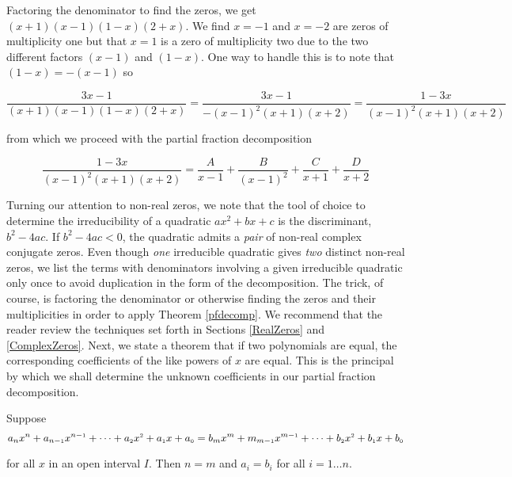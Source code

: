 Factoring the denominator to find the zeros, we get $(x+1)(x-1)(1-x)(2+x)$.  We find $x = -1$ and $x=-2$ are zeros of multiplicity one but that $x=1$ is a zero of multiplicity two due to the two different factors $(x-1)$ and $(1-x)$.  One way to handle this is to note that $(1-x) = -(x-1)$ so 

\[\dfrac{3x-1}{(x+1)(x-1)(1-x)(2+x)} = \dfrac{3x-1}{-(x-1)^2(x+1)(x+2)} = \dfrac{1-3x}{(x-1)^2(x+1)(x+2)}\]

from which we proceed with the partial fraction decomposition

\[\dfrac{1-3x}{(x-1)^2(x+1)(x+2)} = \dfrac{A}{x-1} + \dfrac{B}{(x-1)^2} + \dfrac{C}{x+1} + \dfrac{D}{x+2}\]

Turning our attention to non-real zeros, we note that the tool of choice to determine the irreducibility of a quadratic  $ax^2+bx+c$ is the discriminant, $b^2-4ac$.  If $b^2 - 4ac < 0$, the quadratic admits a \textit{pair} of non-real complex conjugate zeros.  Even though \textit{one} irreducible quadratic gives \textit{two} distinct non-real zeros, we list the terms with denominators involving a given irreducible quadratic only once to avoid duplication in the form of the decomposition.  The trick, of course, is factoring the denominator or otherwise finding the zeros and their multiplicities in order to apply Theorem \ref{pfdecomp}.  We recommend that the reader review the techniques set forth in Sections \ref{RealZeros} and \ref{ComplexZeros}. Next, we state a theorem that if two polynomials are equal, the corresponding coefficients of the like powers of $x$ are equal.  This is the principal by which we shall determine the unknown coefficients in our partial fraction decomposition.

\smallskip

\colorbox{ResultColor}{\bbm

\begin{thm}  \label{polyequality} Suppose \[a_{n} x^{n} + a_{n-\mbox{\tiny$1$}} x^{n-\mbox{\tiny$1$}} + \cdots + a_{\mbox{\tiny $2$}} x^{\mbox{\tiny $2$}} + a_{\mbox{\tiny $1$}} x + a_{\mbox{\tiny $0$}} = b_{m} x^{m} + m_{m-\mbox{\tiny$1$}} x^{m-\mbox{\tiny$1$}} + \cdots + b_{\mbox{\tiny $2$}} x^{\mbox{\tiny $2$}} + b_{\mbox{\tiny $1$}} x + b_{\mbox{\tiny $0$}}\]

for all $x$ in an open interval $I$.  Then $n=m$ and $a_{i} = b_{i}$ for all $i = 1 \ldots n$.


\end{thm}

\ebm}


